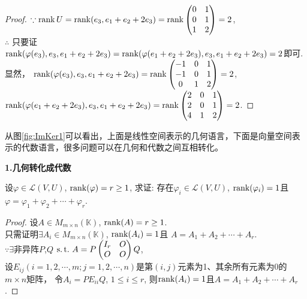\begin{proof}
  $\because \operatorname{rank} U = \operatorname{rank}(e_3,e_1+e_2+2e_3) = \operatorname{rank}
  \begin{pmatrix}
    0 & 1\\
    0 & 1\\
    1 & 2
  \end{pmatrix} = 2$, \\
  $\therefore$ 只要证$\operatorname{rank}(\varphi(e_3), e_3, e_1+e_2+2e_3) =
  \operatorname{rank}(\varphi(e_1+e_2+2e_3), e_3, e_1+e_2+2e_3) = 2$即可. \\
  显然， $\operatorname{rank}(\varphi(e_3), e_3, e_1+e_2+2e_3) = \operatorname{rank}
  \begin{pmatrix}
    -1 & 0 & 1\\
    -1 & 0 & 1\\
     0 & 1 & 2
   \end{pmatrix} = 2$, \\
   $\operatorname{rank}(\varphi(e_1+e_2+2e_3), e_3, e_1+e_2+2e_3) = \operatorname{rank}
   \begin{pmatrix}
     2 & 0 & 1\\
     2 & 0 & 1\\
     4 & 1 & 2
   \end{pmatrix} = 2$.
 \end{proof}
 从图\ref{fig:ImKer1}可以看出，上面是线性空间表示的几何语言，下面是向量空间表示的代数语言，很多问题可以在几何和代数之间互相转化。

\textbf{1.几何转化成代数}

\begin{example}
  设$\varphi \in \mathcal{L}(V, U)$, $\operatorname{rank}(\varphi) = r \geq 1$,
  求证: 存在$\varphi_i \in \mathcal{L}(V, U)$, $\operatorname{rank}(\varphi_i) = 1$且
  $\varphi = \varphi_1+\varphi_2+\cdots+\varphi_r$.
\end{example}

\begin{proof}
  设$A \in M_{m \times n}(\mathbb{K})$, $\operatorname{rank}(A) = r \geq 1$.\\
  只需证明$\exists A_i \in M_{m \times n}(\mathbb{K})$, $\operatorname{rank}(A_i) = 1$且
  $A = A_1+A_2+\cdots+A_r$. \\
  $\because \exists$非异阵$P$,$Q$ $\operatorname{s.t.{}} A = 
  P\begin{pmatrix}
    I_r & O\\
    O   & O
  \end{pmatrix}Q$, \\
  设$E_{ij}(i=1,2,\cdots,m;j=1,2,\cdots,n)$是第$(i,j)$元素为1、其余所有元素为0的$m \times n$矩阵，
  令$A_i = PE_{ii}Q$, $1 \leq i \leq r$, 
  则$\operatorname{rank}(A_i)=1$且$A = A_1+A_2+\cdots+A_r$.
\end{proof}

